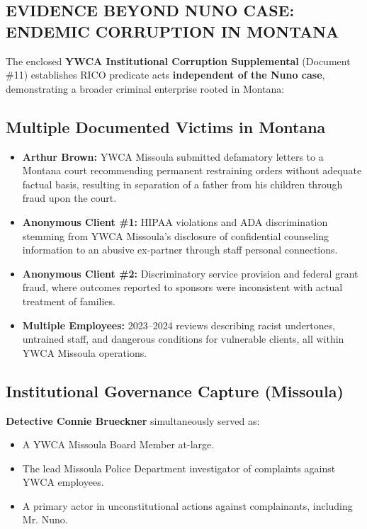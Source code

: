 \documentclass[12pt,oneside]{article}
\begin{document}
\begin{flushleft}
\section*{EVIDENCE BEYOND NUNO CASE: ENDEMIC CORRUPTION IN MONTANA}

The enclosed \textbf{YWCA Institutional Corruption Supplemental} (Document \#11) establishes RICO predicate acts \textbf{independent of the Nuno case}, demonstrating a broader criminal enterprise rooted in Montana:

\subsection*{Multiple Documented Victims in Montana}

\begin{itemize}
\item \textbf{Arthur Brown:} YWCA Missoula submitted defamatory letters to a Montana court recommending permanent restraining orders without adequate factual basis, resulting in separation of a father from his children through fraud upon the court.
\item \textbf{Anonymous Client \#1:} HIPAA violations and ADA discrimination stemming from YWCA Missoula's disclosure of confidential counseling information to an abusive ex-partner through staff personal connections.
\item \textbf{Anonymous Client \#2:} Discriminatory service provision and federal grant fraud, where outcomes reported to sponsors were inconsistent with actual treatment of families.
\item \textbf{Multiple Employees:} 2023--2024 reviews describing racist undertones, untrained staff, and dangerous conditions for vulnerable clients, all within YWCA Missoula operations.
\end{itemize}

\subsection*{Institutional Governance Capture (Missoula)}

\textbf{Detective Connie Brueckner} simultaneously served as:

\begin{itemize}
\item A YWCA Missoula Board Member at-large.
\item The lead Missoula Police Department investigator of complaints against YWCA employees.
\item A primary actor in unconstitutional actions against complainants, including Mr. Nuno.
\end{itemize}


\end{flushleft}
\end{document}
